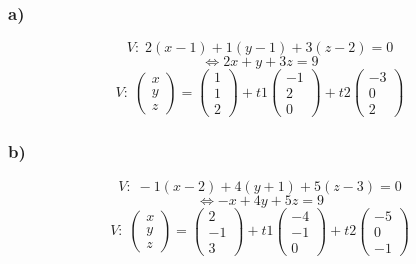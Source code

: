 \documentclass[11pt]{article}
\begin{document}
\subsubsection*{a)}
\[
V:\;2(x-1)+1(y-1)+3(z-2)=0
\]
\[
\Leftrightarrow 2x+y+3z=9
\]
\[
V:\;\begin{pmatrix}
x\\y\\z
\end{pmatrix}
=
\begin{pmatrix}
1\\1\\2
\end{pmatrix}
+t1\begin{pmatrix}
-1\\2\\0
\end{pmatrix}
+t2\begin{pmatrix}
-3\\0\\2
\end{pmatrix}
\]

\subsubsection*{b)}
\[
V:\;-1(x-2)+4(y+1)+5(z-3)=0
\]
\[
\Leftrightarrow -x+4y+5z=9
\]
\[
V:\;\begin{pmatrix}
x\\y\\z
\end{pmatrix}
=
\begin{pmatrix}
2\\-1\\3
\end{pmatrix}
+t1\begin{pmatrix}
-4\\-1\\0
\end{pmatrix}
+t2\begin{pmatrix}
-5\\0\\-1
\end{pmatrix}
\]
\end{document}
